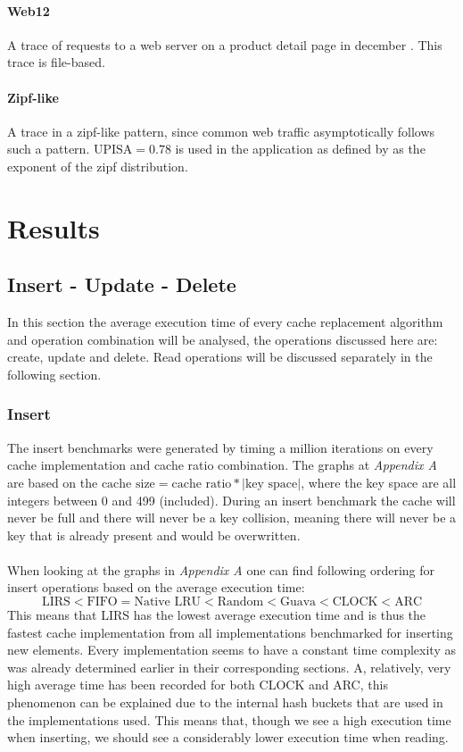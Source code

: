 \documentclass[pdftex,a4paper,12pt,twoside]{report}
\begin{document}
\paragraph{Web12} A trace of requests to a web server on a product detail page in december \citep{cache2k_web12}. This trace is file-based.
\paragraph{Zipf-like} A trace in a zipf-like pattern, since common web traffic asymptotically follows such a pattern. $\text{UPISA} = 0.78$ is used in the application as defined by \cite{breslau1999web} as the exponent of the zipf distribution.
\section{Results}
\subsection{Insert - Update - Delete}
In this section the average execution time of every cache replacement algorithm and operation combination will be analysed, the operations discussed here are: create, update and delete. Read operations will be discussed separately in the following section.
\subsubsection{Insert}
The insert benchmarks were generated by timing a million iterations on every cache implementation and cache ratio combination. The graphs at \emph{Appendix A} are based on the $\text{cache size} = \text{cache ratio} * \left\vert{\text{key space}}\right\vert$, where the key space are all integers between 0 and 499 (included). During an insert benchmark the cache will never be full and there will never be a key collision, meaning there will never be a key that is already present and would be overwritten.
\\\\
When looking at the graphs in \emph{Appendix A} one can find following ordering for insert operations based on the average execution time:
\[
\text{LIRS} < \text{FIFO} = \text{Native LRU} < \text{Random} < \text{Guava} < \text{CLOCK} < \text{ARC}
\]
This means that LIRS has the lowest average execution time and is thus the fastest cache implementation from all implementations benchmarked for inserting new elements.
Every implementation seems to have a constant time complexity as was already determined earlier in their corresponding sections. A, relatively, very high average time has been recorded for both CLOCK and ARC, this phenomenon can be explained due to the internal hash buckets that are used in the implementations used. This means that, though we see a high execution time when inserting, we should see a considerably lower execution time when reading.
\end{document}

